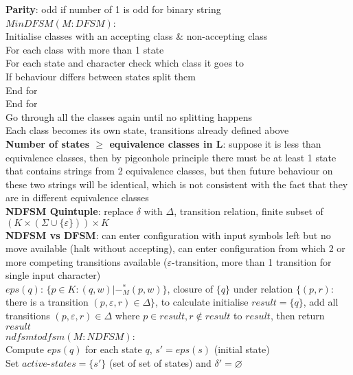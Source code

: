 \documentclass[a4paper]{article}
\begin{document}
\begin{multicols}{2}
        \textbf{Parity}: odd if number of 1 is odd for binary string\\
        \boldmath$MinDFSM(M: DFSM)$\unboldmath:\\
        Initialise classes with an accepting class \& non-accepting class\\
        For each class with more than 1 state\\
        For each state and character check which class it goes to\\
        If behaviour differs between states split them\\
        End for\\
        End for\\
        Go through all the classes again until no splitting happens\\
        Each class becomes its own state, transitions already defined above\\
        \textbf{Number of states $\geq$ equivalence classes in L}: suppose it is less than equivalence classes, then by pigeonhole principle there must be at least 1 state that contains strings from 2 equivalence classes, but then future behaviour on these two strings will be identical, which is not consistent with the fact that they are in different equivalence classes\\
        \textbf{NDFSM Quintuple}: replace $\delta$ with $\Delta$, transition relation, finite subset of $(K \times (\Sigma \cup \{\varepsilon\})) \times K$\\
        \textbf{NDFSM vs DFSM}: can enter configuration with input symbols left but no move available (halt without accepting), can enter configuration from which 2 or more competing transitions available ($\varepsilon$-transition, more than 1 transition for single input character)\\
        \boldmath$eps(q)$\unboldmath: $\{ p \in K : (q,w) |-^*_M (p,w) \}$, closure of $\{q\}$ under relation $\{ (p,r)$: there is a transition $(p, \varepsilon, r) \in \Delta \}$, to calculate initialise $result = \{q\}$, add all transitions $(p, \varepsilon, r) \in \Delta$ where $p \in result, r \notin result$ to $result$, then return $result$\\
        \boldmath$ndfsmtodfsm(M: NDFSM)$\unboldmath:\\
        Compute $eps(q)$ for each state $q$, $s' = eps(s)$ (initial state)\\
        Set $active\mbox{-}states = \{s'\}$ (set of set of states) and $\delta' = \varnothing$\\

\end{multicols}
\end{document}
